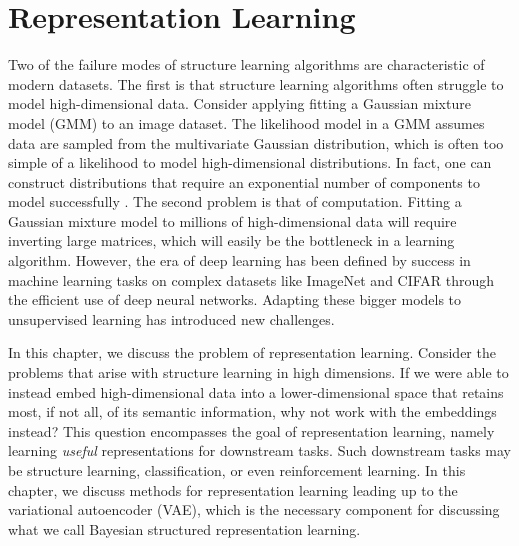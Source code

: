 \chapter{Representation Learning}

Two of the failure modes of structure learning
algorithms are
characteristic
of modern datasets.
The first is that structure learning
algorithms often struggle to 
model high-dimensional data.
Consider applying
fitting a Gaussian mixture
model (GMM) to an image dataset.
The likelihood model in a GMM
assumes data are sampled
from the multivariate Gaussian
distribution, which is
often too simple of a likelihood
to model high-dimensional distributions.
In fact, one can construct
distributions that require an
exponential number of components
to model successfully \cite{TODO}.
The second problem
is that of computation.
Fitting a Gaussian mixture model
to millions of high-dimensional data
will require inverting
large matrices, which will
easily be the bottleneck in a
learning algorithm.
However, the era of deep learning has
been defined by success in machine learning
tasks on
complex datasets
like ImageNet \citep{Deng2009} and CIFAR \citep{CIFAR}
through the efficient use of deep neural networks.
Adapting these bigger models
to
unsupervised learning has 
introduced new challenges.

In this chapter, we discuss the problem
of representation learning.
Consider the problems that arise 
with structure learning in high dimensions.
If we were able to instead embed 
high-dimensional data into a lower-dimensional space
that retains most, if not all,
of its semantic information,
why not work with the embeddings instead?
This question encompasses the goal
of representation learning, namely
learning \emph{useful} representations
for downstream tasks.
Such downstream tasks may
be structure learning, classification,
or even reinforcement learning.
In this chapter, we
discuss methods for representation learning
leading up to the variational autoencoder (VAE),
which is the necessary component
for discussing what we call Bayesian structured representation learning.

